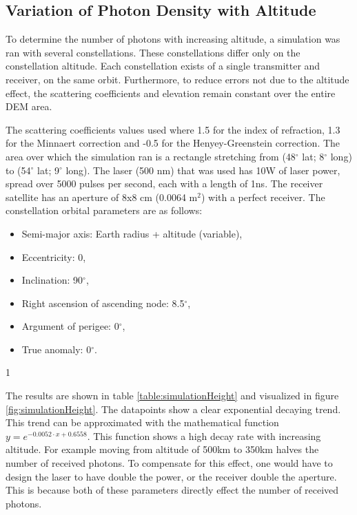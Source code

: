 \subsection{Variation of Photon Density with Altitude}
\label{sec:VariationOfPhotonDensity}

To determine the number of photons with increasing altitude, a simulation was ran with several constellations. These constellations differ only on the constellation altitude. Each constellation exists of a single transmitter and receiver, on the same orbit. Furthermore, to reduce errors not due to the altitude effect, the scattering coefficients and elevation remain constant over the entire \ac{DEM} area.

The scattering coefficients values used where 1.5 for the index of refraction, 1.3 for the Minnaert correction and -0.5 for the Henyey-Greenstein correction. The area over which the simulation ran is a rectangle stretching from (48$^\circ$ lat; 8$^\circ$ long) to (54$^\circ$ lat; 9$^\circ$ long). The \ac{laser} (500 nm) that was used has 10W of \ac{laser} power, spread over 5000 pulses per second, each with a length of 1ns. The receiver satellite has an aperture of 8x8 cm (0.0064 m$^2$) with a perfect receiver. The constellation orbital parameters are as follows:

\begin{itemize}
	\item Semi-major axis:	Earth radius + altitude (variable),
	\item Eccentricity: 0,
	\item Inclination: 90$^\circ$,
	\item Right ascension of ascending node: 8.5$^\circ$,
	\item Argument of perigee: 0$^\circ$,
	\item True anomaly: 0$^\circ$.
\end{itemize}1

The results are shown in table \ref{table:simulationHeight} and visualized in figure \ref{fig:simulationHeight}. The datapoints show a clear exponential decaying trend. This trend can be approximated with the mathematical function $y=e^{-0.0052 \cdot x + 0.6558}$. This function shows a high decay rate with increasing altitude. For example moving from altitude of 500km to 350km halves the number of received photons. To compensate for this effect, one would have to design the \ac{laser} to have double the power, or the receiver double the aperture. This is because both of these parameters directly effect the number of received photons. 

